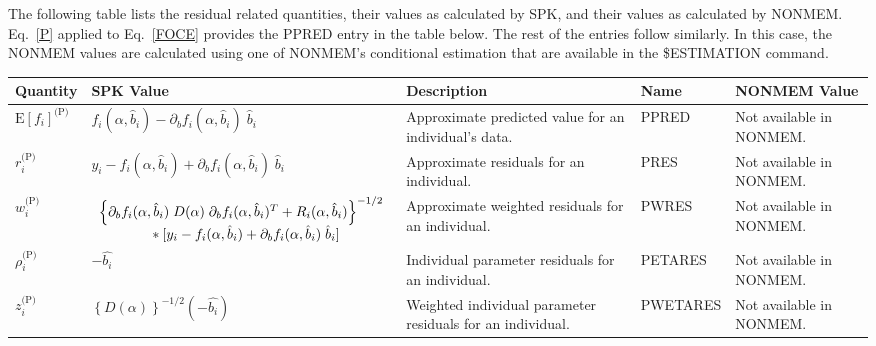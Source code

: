\documentclass{article}
\begin{document}
The following table lists the residual related quantities, their
values as calculated by SPK, and their values as calculated by NONMEM.
Eq.~\ref{P} applied to Eq.~\ref{FOCE} provides the PPRED entry in the table
below. The rest of the entries follow similarly.
In this case, the NONMEM values are calculated using 
one of NONMEM's conditional estimation that are available in the
\$ESTIMATION command.

\begin{center}
\begin{tabular}{|p{0.75in}|p{3.25in}|p{1.1in}|p{0.85in}|p{1.0in}|}
\hline
\hline
  {\bf Quantity}
    & {\bf SPK Value}
    & {\bf Description}
    & {\bf Name}
    & {\bf NONMEM Value} \\
  \hline
  \hline
  $\mbox{E} \left[ f_i \right]^{\mbox{(P)}}$
    & $f_i(\alpha, \hat{b}_i) - \partial_b f_i(\alpha, \hat{b}_i) \; \hat{b}_i$
    & Approximate predicted value for an individual's data.
    & PPRED 
    & Not available in NONMEM.\\
  \hline
  $r^{\mbox{(P)}}_i$
    & $y_i - f_i(\alpha, \hat{b}_i) + \partial_b f_i(\alpha, \hat{b}_i) \; \hat{b}_i$
    & Approximate residuals for an individual.
    & PRES 
    & Not available in NONMEM.\\
  \hline
  $w^{\mbox{(P)}}_i$
    & $\begin{array}{l}
        \left\{ \partial_b f_i(\alpha, \hat{b}_i) \;
          D(\alpha) \; \partial_b f_i(\alpha, \hat{b}_i)^T
          + R_i(\alpha, \hat{b}_i) \right\}^{-1/2} \\
        \mbox{\hspace{0.5in}}
        \ast [ y_i - f_i(\alpha, \hat{b}_i) 
           + \partial_b f_i(\alpha, \hat{b}_i) \; \hat{b}_i ]
      \end{array} $
    & Approximate weighted residuals for an individual.
    & PWRES 
    & Not available in NONMEM.\\
  \hline
  $\rho^{\mbox{(P)}}_i$
    & $-\hat{b_i}$
    & Individual parameter residuals for an individual.
    & PETARES
    & Not available in NONMEM. \\
  \hline
  $z^{\mbox{(P)}}_i$
    & $\left\{ D(\alpha) \right\}^{-1/2} ( - \hat{b_i} )$
    & Weighted individual parameter residuals for an individual.
    & PWETARES
    & Not available in NONMEM. \\
  \hline
  \hline
\end{tabular}
\end{center}

\newpage
\end{document}
